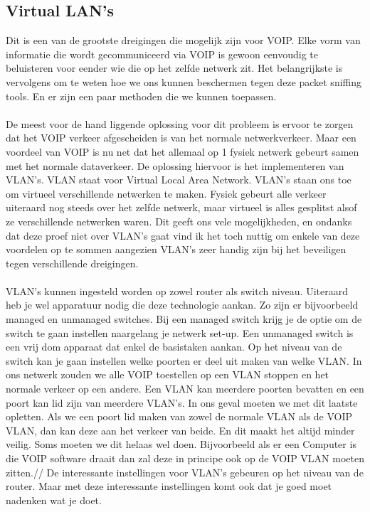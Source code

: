 \documentclass[pdftex,a4paper,12pt,twoside]{report}
\begin{document}
\subsection{Virtual LAN's}
Dit is een van de grootste dreigingen die mogelijk zijn voor VOIP. Elke vorm van informatie die wordt gecommuniceerd via VOIP is gewoon eenvoudig te beluisteren voor eender wie die op het zelfde netwerk zit. Het belangrijkste is vervolgens om te weten hoe we ons kunnen beschermen tegen deze packet sniffing tools. En er zijn een paar methoden die we kunnen toepassen.  \\ \\
De meest voor de hand liggende oplossing voor dit probleem is ervoor te zorgen dat het VOIP verkeer afgescheiden is van het normale netwerkverkeer. Maar een voordeel van VOIP is nu net dat het allemaal op 1 fysiek netwerk gebeurt samen met het normale dataverkeer. De oplossing hiervoor is het implementeren van VLAN's. VLAN staat voor  Virtual Local Area Network. VLAN's staan ons toe om virtueel verschillende netwerken te maken. Fysiek gebeurt alle verkeer uiteraard nog steeds over het zelfde netwerk, maar virtueel is alles gesplitst alsof ze verschillende netwerken waren. Dit geeft ons vele mogelijkheden, en ondanks dat deze proef niet over VLAN's gaat vind ik het toch nuttig om enkele van deze voordelen op te sommen aangezien VLAN's zeer handig zijn bij het beveiligen tegen verschillende dreigingen. 
\\
\\
VLAN's kunnen ingesteld worden op zowel router als switch niveau. Uiteraard heb je wel apparatuur nodig die deze technologie aankan. Zo zijn er bijvoorbeeld managed en unmanaged switches. Bij een managed switch krijg je de optie om de switch te gaan instellen naargelang je netwerk set-up. Een unmanaged switch is een vrij dom apparaat dat enkel de basistaken aankan.
Op het niveau van de switch kan je gaan instellen welke poorten er deel uit maken van welke VLAN. In ons netwerk zouden we alle VOIP toestellen op een VLAN stoppen en het normale verkeer op een andere. Een VLAN kan meerdere poorten bevatten en een poort kan lid zijn van meerdere VLAN's. In ons geval moeten we met dit laatste opletten. Als we een poort lid maken van zowel de normale VLAN als de VOIP VLAN, dan kan deze aan het verkeer van beide. En dit maakt het altijd minder veilig. Soms moeten we dit helaas wel doen. Bijvoorbeeld als er een Computer is die VOIP software draait dan zal deze in principe ook op de VOIP VLAN moeten zitten.//
De interessante instellingen voor VLAN's gebeuren op het niveau van de router. Maar met deze interessante instellingen komt ook dat je goed moet nadenken wat je doet.  
\newpage
\end{document}
